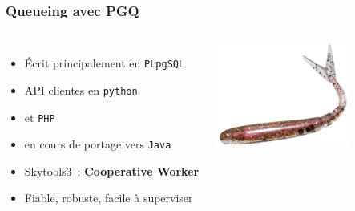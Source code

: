 \documentclass[english]{beamer}
\begin{document}
\begin{frame}[fragile]
  \frametitle{Queueing avec PGQ}

  \linebreak

\begin{columns}[c]

  \begin{itemize}
   \item<1-> Écrit principalement en \texttt{PLpgSQL}
   \item<1-> API clientes en \texttt{python}
   \item<1-> et \texttt{PHP}
   \item<2-> en cours de portage vers \texttt{Java}
   \item<3-> Skytools3 : \textbf{Cooperative Worker}
   \item<3-> Fiable, robuste, facile à superviser
  \end{itemize}  

\includegraphics[height=9em]{drop-queue.png}
\end{columns}
\end{frame}
\end{document}
